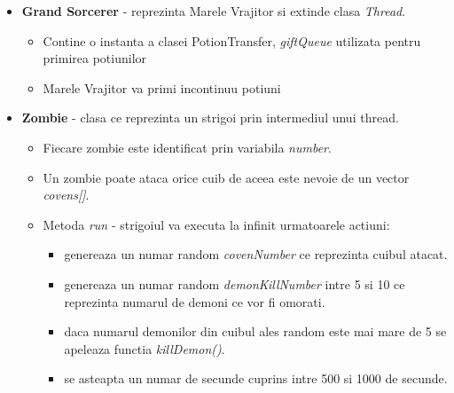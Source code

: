 \documentclass{article}
\begin{document}
\begin{itemize}
        \item \textbf{Grand Sorcerer} - reprezinta Marele Vrajitor si extinde clasa \textit{Thread}.
            \begin{itemize}
                \item Contine o instanta a clasei PotionTransfer, \textit{giftQueue} utilizata pentru primirea potiunilor
                \item Marele Vrajitor va primi incontinuu potiuni
                    
            \end{itemize}
        \item \textbf{Zombie} - clasa ce reprezinta un strigoi prin intermediul unui thread.
         \begin{itemize}
            \item Fiecare zombie este identificat prin variabila \textit{number}.
             \item Un zombie poate ataca orice cuib de aceea este nevoie de un vector \textit{covens[]}.
              \item Metoda \textit{run} - strigoiul va executa la infinit urmatoarele actiuni:
              \begin{itemize}
                \item genereaza un numar random \textit{covenNumber} ce reprezinta cuibul atacat.
                \item genereaza un numar random \textit{demonKillNumber} intre 5 si 10 ce reprezinta numarul de demoni ce vor fi omorati.
                \item daca numarul demonilor din cuibul ales random este mai mare de 5 se apeleaza functia \textit{killDemon()}.
                \item se asteapta un numar de secunde cuprins intre 500 si 1000 de secunde.
              

\end{itemize}
\end{itemize}
\end{itemize}
\end{document}
